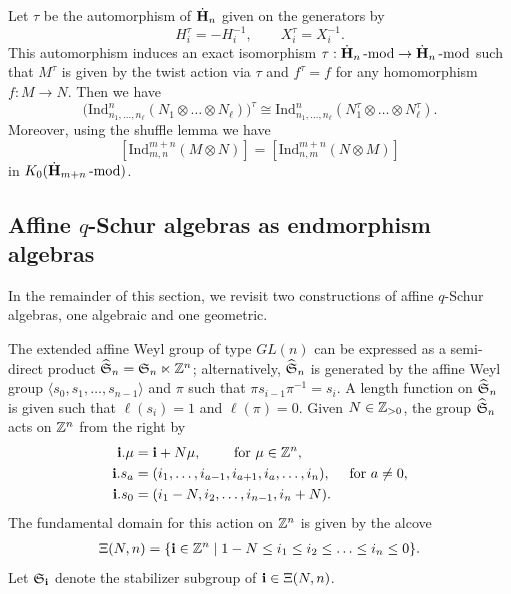 Let $\tau$ be the automorphism of $\dot{\bf H}_n$ given on the generators by 
\[ 
H_i^\tau= -H_i^{-1}, \qquad
X_i^\tau= X_{i}^{-1}. 
\]
 This automorphism induces an exact isomorphism $\tau: \dot{\bf H}_n\operatorname{-mod}\nolimits\rightarrow \dot{\bf H}_n\operatorname{-mod}\nolimits$
such that $ M^\tau$ is given by the twist action via $\tau$ and $f^\tau=f$ for any homomorphism  $f: M\rightarrow N$.
Then  we have 
\begin{equation}
\label{equ:antiind}
  \big(\text{Ind}_{n_1,\ldots,n_\ell}^n (N_1\otimes \ldots \otimes N_\ell)\big)^\tau \cong \text{Ind}_{n_1,\ldots,n_\ell}^n (N_1^\tau\otimes \ldots\otimes  N_\ell^\tau).  \end{equation}
Moreover, using the shuffle lemma 
we have 
\begin{equation}
\label{equ:shuffle}
    [\text{Ind}_{m,n}^{m+n} (M\otimes N)]  = [\text{Ind}_{n,m}^{m+n} (N\otimes M)]
\end{equation}
in $K_0(\dot{\bf H}_{m+n}\operatorname{-mod}\nolimits)$. 

\subsection{Affine $q$-Schur algebras as endmorphism algebras}

In the remainder of this section, we revisit two constructions of affine $q$-Schur algebras, one algebraic and one geometric. 

The extended affine Weyl group of type $GL(n)$ can be expressed as a semi-direct product $\widehat{\mathfrak S}_n =\mathfrak S_n \ltimes \mathbb{Z}^n$; alternatively, $\widehat{\mathfrak S}_n$ is generated by the affine Weyl group $\langle s_0, s_1, \ldots, s_{n-1}\rangle$ and $\pi$ such that $\pi s_{i-1} \pi^{-1} =s_i$. A length function on $\widehat{\mathfrak S}_n$ is given such that $\ell(s_i)=1$ and $\ell(\pi)=0$. 
Given $N\in \mathbb{Z}_{>0}$, the group $\widehat{\mathfrak S}_n$ acts on $\mathbb{Z}^n$ from the right by
\begin{align*} 
    \mathbf{i} . \mu &= \mathbf{i}+N\mu, \qquad \text{ for }\mu \in \mathbb{Z}^n,
    \\
    \mathbf{i} . s_a &=(i_1, \ldots, i_{a-1}, i_{a+1}, i_{a}, \ldots, i_n), \quad \text{ for } a \neq 0,
    \\
     \mathbf{i} . s_0 &=(i_1-N, i_2,  \ldots, i_{n-1}, i_n+N).   
\end{align*}
The fundamental domain for this action on $\mathbb{Z}^n$ is given by the alcove
\begin{align*}
    \Xi(N,n) =\{ \mathbf{i} \in \mathbb{Z}^n \mid 1-N \le i_1\le i_2 \le \ldots \le i_n \le 0 \}.
\end{align*}
Let $\mathfrak S_{\mathbf{i}}$ denote the stabilizer subgroup of $\mathbf{i} \in \Xi(N,n)$. 

